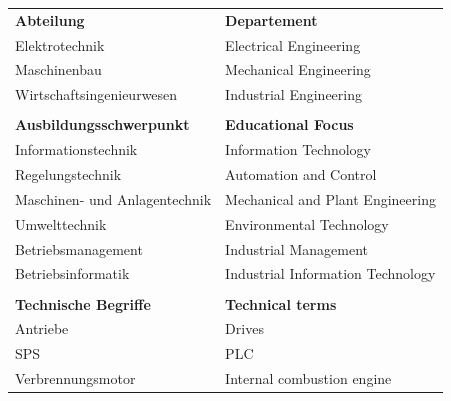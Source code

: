 \renewcommand*{\authorOfNextLines}{HTL Weiz}
\begin{tabular}{ll}
	\textbf{Abteilung}				& \textbf{Departement} \\
	Elektrotechnik					& Electrical Engineering\\
	Maschinenbau					& Mechanical Engineering\\
	Wirtschaftsingenieurwesen		& Industrial Engineering\\
	\\
	\textbf{Ausbildungsschwerpunkt}	& \textbf{Educational Focus}\\
	Informationstechnik				& Information Technology\\
	Regelungstechnik				& Automation and Control\\
	Maschinen- und Anlagentechnik	& Mechanical and Plant Engineering\\
	Umwelttechnik					& Environmental Technology\\
	Betriebsmanagement				& Industrial Management\\
	Betriebsinformatik				& Industrial Information Technology\\
	\\
	\textbf{Technische Begriffe}	& \textbf{Technical terms}\\
	Antriebe						& Drives\\
	SPS								& PLC\\
	Verbrennungsmotor				& Internal combustion engine\\
\end{tabular}
\unstretchTableRows